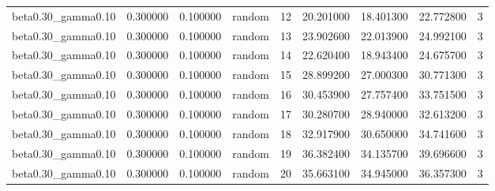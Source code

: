 \begin{tabular}{lrrlrrrrr}
beta0.30\_gamma0.10 & 0.300000 & 0.100000 & random & 12 & 20.201000 & 18.401300 & 22.772800 & 3 \\
beta0.30\_gamma0.10 & 0.300000 & 0.100000 & random & 13 & 23.902600 & 22.013900 & 24.992100 & 3 \\
beta0.30\_gamma0.10 & 0.300000 & 0.100000 & random & 14 & 22.620400 & 18.943400 & 24.675700 & 3 \\
beta0.30\_gamma0.10 & 0.300000 & 0.100000 & random & 15 & 28.899200 & 27.000300 & 30.771300 & 3 \\
beta0.30\_gamma0.10 & 0.300000 & 0.100000 & random & 16 & 30.453900 & 27.757400 & 33.751500 & 3 \\
beta0.30\_gamma0.10 & 0.300000 & 0.100000 & random & 17 & 30.280700 & 28.940000 & 32.613200 & 3 \\
beta0.30\_gamma0.10 & 0.300000 & 0.100000 & random & 18 & 32.917900 & 30.650000 & 34.741600 & 3 \\
beta0.30\_gamma0.10 & 0.300000 & 0.100000 & random & 19 & 36.382400 & 34.135700 & 39.696600 & 3 \\
beta0.30\_gamma0.10 & 0.300000 & 0.100000 & random & 20 & 35.663100 & 34.945000 & 36.357300 & 3 \\
\bottomrule
\end{tabular}
